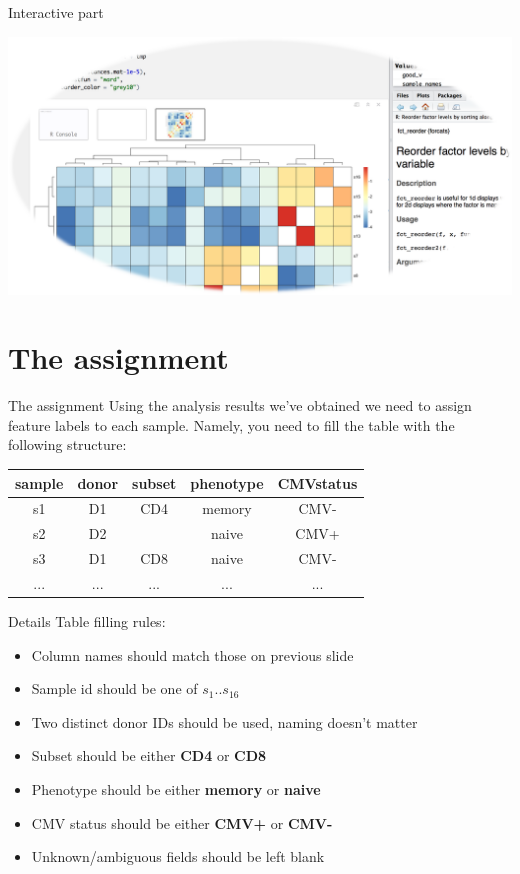 \documentclass[12pt]{beamer}
\begin{document}
\begin{frame}{Interactive part}
\begin{center}
\includegraphics[width=\textwidth]{../splash}
\end{center}
\end{frame}

\section{The assignment}

\begin{frame}{The assignment}
Using the analysis results we've obtained we need to assign feature labels to each sample. Namely, you need to fill the table with the following structure:
\begin{table}[h!]
  \begin{center}
    \begin{tabular}{c|c|c|c|c}
      \textbf{sample} & \textbf{donor} & \textbf{subset} & \textbf{phenotype} & \textbf{CMVstatus} \\
      \hline
      s1 & D1 & CD4 & memory & CMV- \\
      s2 & D2 &   & naive & CMV+ \\
      s3 & D1 & CD8 & naive & CMV- \\
      ... & ... & ... & ... & ... \\
    \end{tabular}
  \end{center}
\end{table}
\end{frame}

\begin{frame}{Details}
Table filling rules:
\begin{itemize}
\item Column names should match those on previous slide
\item Sample id should be one of $s_1..s_{16}$
\item Two distinct donor IDs should be used, naming doesn't matter
\item Subset should be either \textbf{CD4} or \textbf{CD8}
\item Phenotype should be either \textbf{memory} or \textbf{naive}
\item CMV status should be either \textbf{CMV+} or \textbf{CMV-}
\item Unknown/ambiguous fields should be left blank
\end{itemize}
\end{frame}
\end{document}

